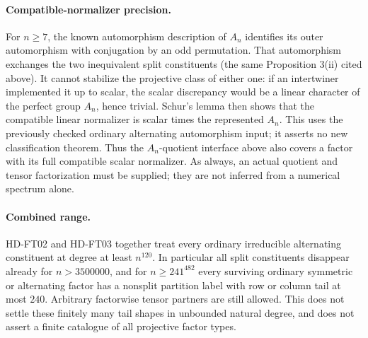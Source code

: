 \paragraph{Compatible-normalizer precision.}
For \(n\ge7\), the known automorphism description of \(A_n\) identifies
its outer automorphism with conjugation by an odd permutation.
That automorphism exchanges the two inequivalent split constituents
(the same Proposition 3(ii) cited above).
It cannot stabilize the projective class of either one:
if an intertwiner implemented it up to scalar, the scalar discrepancy
would be a linear character of the perfect group \(A_n\), hence trivial.
Schur's lemma then shows that the compatible linear normalizer is
scalar times the represented \(A_n\).  This uses the previously checked
ordinary alternating automorphism input; it asserts no new
classification theorem.  Thus the \(A_n\)-quotient interface above
also covers a factor with its full compatible scalar normalizer.
As always, an actual quotient and tensor factorization must be supplied;
they are not inferred from a numerical spectrum alone.

\paragraph{Combined range.}
HD-FT02 and HD-FT03 together treat every ordinary irreducible
alternating constituent at degree at least \(n^{120}\).
In particular all split constituents disappear already for
\(n>3500000\), and for
\(n\ge241^{482}\) every surviving ordinary symmetric or alternating
factor has a nonsplit partition label with row or column tail at
most \(240\).  Arbitrary factorwise tensor partners are still allowed.
This does not settle these finitely many tail shapes in unbounded
natural degree, and does not assert a finite catalogue of all
projective factor types.
